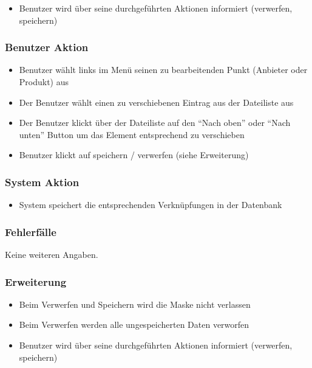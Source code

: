 \documentclass[a4paper,12pt]{article}
\begin{document}
\begin{itemize}

\item
  Benutzer wird über seine durchgeführten Aktionen informiert
  (verwerfen, speichern)
\end{itemize}

\subsubsection{Benutzer Aktion}\label{benutzer-aktion-6}

\begin{itemize}

\item
  Benutzer wählt links im Menü seinen zu bearbeitenden Punkt (Anbieter
  oder Produkt) aus
\item
  Der Benutzer wählt einen zu verschiebenen Eintrag aus der Dateiliste
  aus
\item
  Der Benutzer klickt über der Dateiliste auf den ``Nach oben'' oder
  ``Nach unten'' Button um das Element entsprechend zu verschieben
\item
  Benutzer klickt auf speichern / verwerfen (siehe Erweiterung)
\end{itemize}

\subsubsection{System Aktion}\label{system-aktion-6}

\begin{itemize}

\item
  System speichert die entsprechenden Verknüpfungen in der Datenbank
\end{itemize}

\subsubsection{Fehlerfälle}\label{fehlerfalle-6}
Keine weiteren Angaben.

\subsubsection{Erweiterung}\label{erweiterung-6}

\begin{itemize}

\item
  Beim Verwerfen und Speichern wird die Maske nicht verlassen
\item
  Beim Verwerfen werden alle ungespeicherten Daten verworfen
\item
  Benutzer wird über seine durchgeführten Aktionen informiert
  (verwerfen, speichern)
\end{itemize}
\end{document}
